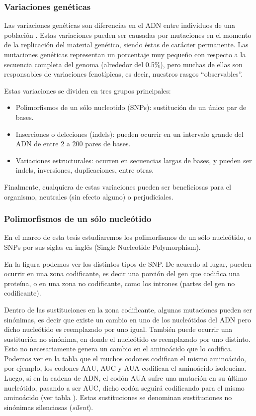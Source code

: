 \newpage


\subsubsection{Variaciones genéticas}

Las variaciones genéticas son diferencias en el ADN entre individuos de una población \cite{EMBL}. Estas variaciones pueden ser causadas por mutaciones en el momento de la replicación del material genético, siendo éstas de carácter permanente. Las mutaciones genéticas representan un porcentaje muy pequeño con respecto a la secuencia completa del genoma (alrededor del 0.5\%), pero muchas de ellas son responsables de variaciones fenotípicas, es decir, nuestros rasgos ``observables''. 

Estas variaciones se dividen en tres grupos principales:

\begin{itemize}
    \item Polimorfismos de un sólo nucleotido (SNPs): sustitución de un único par de bases. 
    \item Inserciones o deleciones (indels): pueden ocurrir en un intervalo grande del ADN de entre 2 a 200 pares de bases.
    \item Variaciones estructurales: ocurren en secuencias largas de bases, y pueden ser indels, inversiones, duplicaciones, entre otras.
    
\end{itemize}

Finalmente, cualquiera de estas variaciones pueden ser beneficiosas para el organismo, neutrales (sin efecto alguno) o perjudiciales. 

\subsubsection{Polimorfismos de un sólo nucleótido}

En el marco de esta tesis estudiaremos los polimorfismos de un sólo nucleótido, o SNPs por sus siglas en inglés (Single Nucleotide Polymorphism). 

En la figura  podemos ver los distintos tipos de SNP. De acuerdo al lugar, pueden ocurrir en una zona codificante, es decir una porción del gen que codifica una proteína, o en una zona no codificante, como los intrones (partes del gen no codificante).

Dentro de las sustituciones en la zona codificante, algunas mutaciones pueden ser sinónimas, es decir que existe un cambio en uno de los nucleótidos del ADN pero dicho nucleótido es reemplazado por uno igual. También puede ocurrir una sustitución no sinónima, en donde el nucleótido es reemplazado por uno distinto. Esto no necesariamente genera un cambio en el aminoácido que lo codifica. Podemos ver en la tabla  que el muchos codones codifican el mismo aminoácido, por ejemplo, los codones AAU, AUC y AUA codifican el aminoácido isoleucina. Luego, si en la cadena de ADN, el codón AUA sufre una mutación en su último nucleótido, pasando a ser AUC, dicho codón seguirá codificando para el mismo aminoácido (ver tabla ). Estas sustituciones se denominan sustituciones no sinónimas silenciosas (\textit{silent}).

